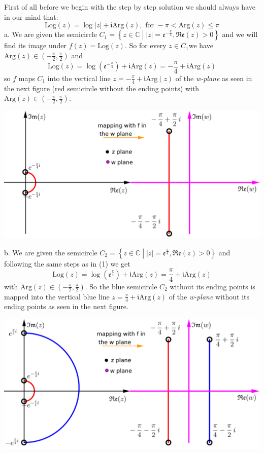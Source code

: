 \documentclass[11pt]{amsart}
\newcommand{\dsp}{\displaystyle}
\newcommand{\BBC}{\mathbb{C}}\newcommand{\mi}{\mathfrak{i}}
\begin{document}
First of all before we begin with the step by step solution we should always have in our 
mind that: \[\textrm{Log}(z)=\log|z|+\mi\textrm{Arg}(z),\text{ 
for }-\pi<\textrm{Arg}(z)\leq \pi\]
a. We are given the semicircle $\dsp 
C_{1}=\left\{z\in\BBC\;\left|\;|z|=\mathfrak{e}^{-\frac{\pi}{4}},\mathfrak{Re}
(z)>0\right.\right\}$ and we 
will find its image under $\dsp f(z)=\textrm{Log}(z)$. So for every $z\in C_{1}$we have 
$\dsp \textrm{Arg}(z)\in\left(-\frac{\pi}{2},\frac{\pi}{2}\right)$ and 
\[\text{Log}(z)=\log(\mathfrak{e}^{-\frac{\pi}{4}})+\mi\textrm{Arg}(z) = 
-\frac{\pi}{4}+\mi\textrm{Arg}(z)\] so  $f$ maps $C_1$ into the vertical line $\dsp 
z=-\frac{\pi}{4}+\mi\textrm{Arg}(z)$ of the \textit{w-plane} as seen in the next 
figure (red semicircle without the ending points) with 
$\dsp\text{Arg}(z)\in\left(-\frac{\pi}{2},\frac{\pi}{2}\right)$.
\begin{center}
\includegraphics{2a.png}
\end{center}
b. We are given the semicircle $\dsp 
C_{2}=\left\{z\in\BBC\;\left|\;|z|=\mathfrak{e}^{\frac{\pi}{4}},\mathfrak{Re}
(z)>0\right.\right\}$ and 
following the same steps as in (1) we get 
\[\textrm{Log}(z)=\log\left(\mathfrak{e}^{\frac{\pi}{4}}\right)+\mi\textrm{Arg}(z)=
\frac{\pi}{4}+\mi\textrm{Arg}(z)\] with 
$\dsp\textrm{Arg}(z)\in\left(-\frac{\pi}{2},\frac{\pi}{2}\right)$. So the blue semicircle 
$C_2$ without its 
ending points is mapped into the vertical blue line $\dsp z=\frac{\pi}{4}+\mi\textrm{Arg}(z)$ of the \textit{w-plane} without its ending 
points as seen in the next figure.
\begin{center}
\includegraphics{2b.png}
\end{center}
\end{document}
